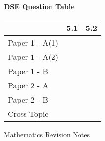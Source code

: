 \documentclass[12pt, a4paper]{article}
\begin{document}
\begin{absolutelynopagebreak}
\begin{center}
\textbf{DSE Question Table}
\end{center}
\begin{center}
\begin{tabular}{|l|c|c|}
\hline
        & 5.1 & 5.2 \\\hline
\hline
Paper 1 - A(1)&  &  \\
\hline
Paper 1 - A(2)&  &  \\
\hline
Paper 1 - B&  &  \\
\hline
\hline
Paper 2 - A&  &  \\
\hline
Paper 2 - B&  &  \\
\hline
\hline
Cross Topic&  &  \\
\hline
\end{tabular}
\end{center}
\end{absolutelynopagebreak}
\newpage
\newpage
\thispagestyle{empty}
\begin{center}
Mathematics Revision Notes\\\vspace{1cm}
\\\vspace{1cm}
{\fontsize{24pt}{24pt}\selectfont {Introduction to Geometry}} \\\vspace{1cm}
\label{chapter:S1-6}

\end{center}
\vspace{0.5cm}
\hline
\end{document}
